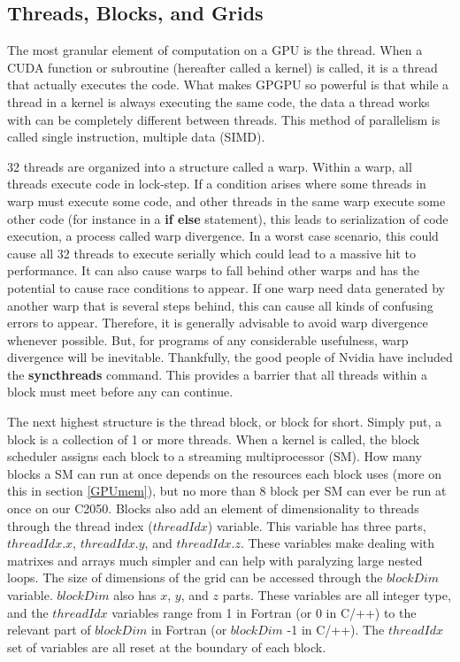 \documentclass[12pt]{report}
\newcommand{\comm}[1]{\textbf{#1}}
\begin{document}
\subsection{Threads, Blocks, and Grids}\label{ThBlGr}
The most granular element of computation on a GPU is the thread. When a CUDA function or subroutine (hereafter called a kernel) is called, it is a thread that actually executes the code. What makes GPGPU so powerful is that while a thread in a kernel is always executing the same code, the data a thread works with can be completely different between threads. This method of parallelism is called single instruction, multiple data (SIMD). 

32 threads are organized into a structure called a warp. Within a warp, all threads execute code in lock-step. If a condition arises where some threads in warp must execute some code, and other threads in the same warp execute some other code (for instance in a \textbf{if else} statement), this leads to serialization of code execution, a process called warp divergence. In a worst case scenario, this could cause all 32 threads to execute serially which could lead to a massive hit to performance. It can also cause warps to fall behind other warps and has the potential to cause race conditions to appear. If one warp need data generated by another warp that is several steps behind, this can cause all kinds of confusing errors to appear. Therefore, it is generally advisable to avoid warp divergence whenever possible. But, for programs of any considerable usefulness, warp divergence will be inevitable. Thankfully, the good people of Nvidia have included the \comm{syncthreads} command. This provides a barrier that all threads within a block must meet before any can continue. 

The next highest structure is the thread block, or block for short. Simply put, a block is a collection of 1 or more threads. When a kernel is called, the block scheduler assigns each block to a streaming multiprocessor (SM). How many blocks a SM can run at once depends on the resources each block uses (more on this in section \ref{GPUmem}), but no more than 8 block per SM can ever be run at once on our C2050. Blocks also add an element of dimensionality to threads through the thread index ($threadIdx$) variable. This variable has three parts, $threadIdx.x$, $threadIdx.y$, and $threadIdx.z$. These variables make dealing with matrixes and arrays much simpler and can help with paralyzing large nested loops. The size of dimensions of the grid can be accessed through the $blockDim$ variable. $blockDim$ also has $x$, $y$, and $z$ parts. These variables are all integer type, and the $threadIdx$ variables range from 1 in Fortran (or 0 in C/++) to the relevant part of $blockDim$ in Fortran (or $blockDim$ -1 in C/++). The $threadIdx$ set of variables are all reset at the boundary of each block. 
\end{document}

